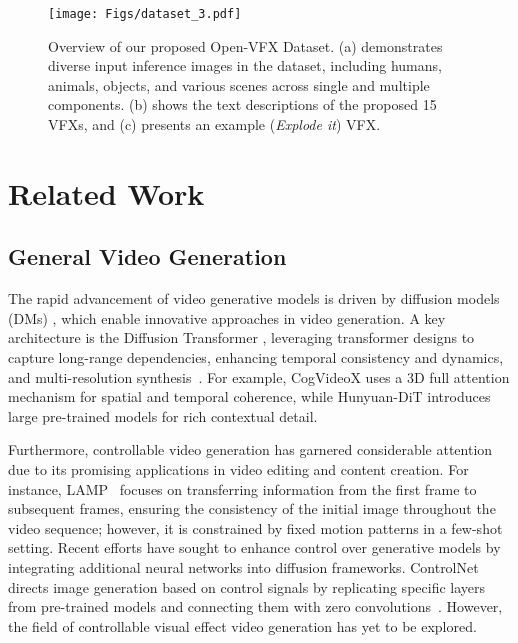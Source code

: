 \begin{figure*}[htbp]
    \centering
    \texttt{[image: Figs/dataset\_3.pdf]}
    \caption{Overview of our proposed Open-VFX Dataset. (a) demonstrates diverse input inference images in the dataset, including humans, animals, objects, and various scenes across single and multiple components. (b) shows the text descriptions of the proposed 15 VFXs, and (c) presents an example (\emph{Explode it}) VFX.}
    \label{fig:Overview_Dataset}
\end{figure*}


\section{Related Work}

\subsection{General Video Generation}
The rapid advancement of video generative models is driven by diffusion models (DMs) \cite{sohl2015deep, rombach2022highresolutionimagesynthesislatent, ho2020denoising, song2020score, nichol2021glide}, which enable innovative approaches in video generation.
A key architecture is the Diffusion Transformer \cite{peebles2023scalable}, leveraging transformer designs to capture long-range dependencies, enhancing temporal consistency and dynamics, and multi-resolution synthesis~\cite{yang2024cogvideox, ma2024latte, shao2024human4dit, videoworldsimulators2024, chen2023videocrafter1, kuaishou2024keling, genmo2024mochi}.
For example, CogVideoX \cite{yang2024cogvideox} uses a 3D full attention mechanism for spatial and temporal coherence, while Hunyuan-DiT \cite{li2024hunyuanditpowerfulmultiresolutiondiffusion} introduces large pre-trained models for rich contextual detail. 



Furthermore, controllable video generation has garnered considerable attention due to its promising applications in video editing and content creation. 
For instance, LAMP~\cite{wu2023lamp} focuses on transferring information from the first frame to subsequent frames, ensuring the consistency of the initial image throughout the video sequence; however, it is constrained by fixed motion patterns in a few-shot setting. 
Recent efforts have sought to enhance control over generative models by integrating additional neural networks into diffusion frameworks. 
ControlNet~\cite{zhang2023adding} directs image generation based on control signals by replicating specific layers from pre-trained models and connecting them with zero convolutions~\cite{wang2024disco}. However, the field of controllable visual effect video generation has yet to be explored.

